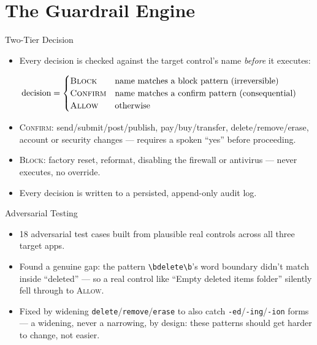 \documentclass[12pt]{beamer}
\begin{document}
\section{The Guardrail Engine}

\begin{frame}{Two-Tier Decision}

\begin{itemize}
  \item Every decision is checked against the target control's name
    \emph{before} it executes:
\end{itemize}

{\small
\[
  \text{decision} =
  \begin{cases}
    \textsc{Block}   & \text{name matches a block pattern (irreversible)} \\
    \textsc{Confirm} & \text{name matches a confirm pattern (consequential)} \\
    \textsc{Allow}   & \text{otherwise}
  \end{cases}
\]
}

\begin{itemize}
  \item \textsc{Confirm}: send/submit/post/publish, pay/buy/transfer,
    delete/remove/erase, account or security changes --- requires a
    spoken ``yes'' before proceeding.
  \item \textsc{Block}: factory reset, reformat, disabling the firewall
    or antivirus --- never executes, no override.
  \item Every decision is written to a persisted, append-only audit log.
\end{itemize}

\end{frame}

\begin{frame}{Adversarial Testing}

\begin{itemize}
  \item 18 adversarial test cases built from plausible real controls
    across all three target apps.
  \item Found a genuine gap: the pattern
    \texttt{\textbackslash bdelete\textbackslash b}'s word boundary
    didn't match inside ``deleted'' --- so a real control like ``Empty
    deleted items folder'' silently fell through to \textsc{Allow}.
  \item Fixed by widening \texttt{delete}/\texttt{remove}/\texttt{erase}
    to also catch \texttt{-ed}/\texttt{-ing}/\texttt{-ion} forms --- a
    widening, never a narrowing, by design: these patterns should get
    harder to change, not easier.
\end{itemize}

\end{frame}
\end{document}
